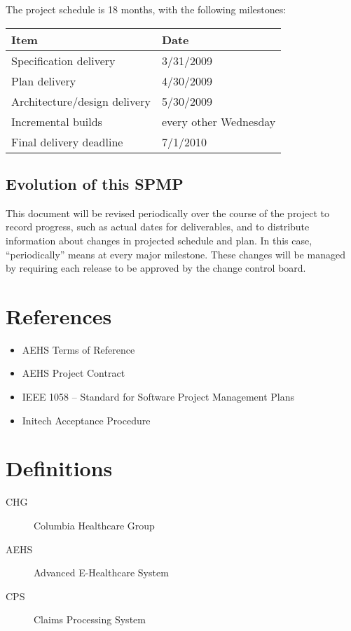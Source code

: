 \documentclass[11pt]{article}
\begin{document}
The project schedule is 18 months, with the following milestones:

\begin{center}
  \begin{tabulary}{\textwidth}{L|l}
    \bf{Item}                    & \bf{Date}             \\
    \hline \hline
    Specification delivery       & 3/31/2009             \\
    Plan delivery                & 4/30/2009             \\
    Architecture/design delivery & 5/30/2009             \\
    Incremental builds           & every other Wednesday \\
    Final delivery deadline      & 7/1/2010
  \end{tabulary}
\end{center}


\subsection{Evolution of this SPMP}
This document will be revised periodically over the course of the project to record progress, such
as actual dates for deliverables, and to distribute information about changes in projected schedule
and plan.  In this case, ``periodically'' means at every major milestone.  These changes will be
managed by requiring each release to be approved by the change control board.



\section{References}
\begin{itemize}
\item AEHS Terms of Reference
\item AEHS Project Contract
\item IEEE 1058 -- Standard for Software Project Management Plans
\item Initech Acceptance Procedure
\end{itemize}


\section{Definitions}
\begin{description}
\item[CHG] Columbia Healthcare Group
\item[AEHS] Advanced E-Healthcare System
\item[CPS] Claims Processing System
\end{description}
\end{document}
